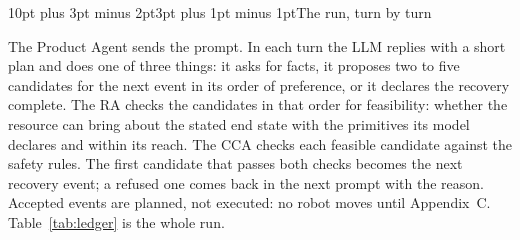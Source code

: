 \documentclass[preprint,12pt,authoryear]{elsarticle}
\makeatletter
\renewcommand\subsection{\@startsection{subsection}{2}{\z@}%
  {10pt plus 3pt minus 2pt}{3pt plus 1pt minus 1pt}{\normalsize\bfseries}}
\makeatother
\begin{document}
\subsection{The run, turn by turn}

The Product Agent sends the prompt. In each turn the LLM replies with a short plan and does
one of three things: it asks for facts, it proposes two to five candidates for the next event
in its order of preference, or it declares the recovery complete. The RA checks the candidates in that
order for feasibility: whether the resource can bring about the stated end state with the
primitives its model declares and within its reach. The CCA checks each feasible candidate against the
safety rules. The first candidate that passes both checks becomes the next recovery event; a
refused one comes back in the next prompt with the reason. Accepted events are planned, not
executed: no robot moves until Appendix~C. Table~\ref{tab:ledger} is the whole run.
\end{document}
